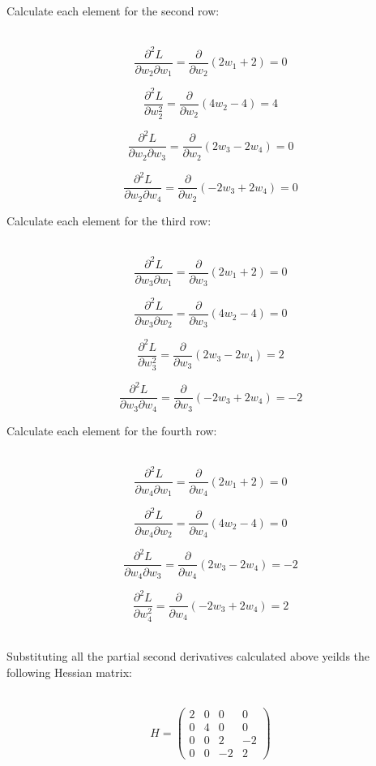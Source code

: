 \documentclass{article}
\begin{document}
\parbox{\textwidth}{
Calculate each element for the second row:
}\\

$$\frac{\partial^2 L}{\partial w_2 \partial w_1} = \frac{\partial}{\partial w_2}(2w_1 + 2) = 0$$

$$\frac{\partial^2 L}{\partial w_2^2} = \frac{\partial}{\partial w_2}(4w_2 - 4) = 4$$

$$\frac{\partial^2 L}{\partial w_2 \partial w_3} = \frac{\partial}{\partial w_2}(2w_3 - 2w_4) = 0$$

$$\frac{\partial^2 L}{\partial w_2 \partial w_4} = \frac{\partial}{\partial w_2}(-2w_3 + 2w_4) = 0$$

\parbox{\textwidth}{
Calculate each element for the third row:
}\\

$$\frac{\partial^2 L}{\partial w_3 \partial w_1} = \frac{\partial}{\partial w_3}(2w_1 + 2) = 0$$

$$\frac{\partial^2 L}{\partial w_3 \partial w_2} = \frac{\partial}{\partial w_3}(4w_2 - 4) = 0$$

$$\frac{\partial^2 L}{\partial w_3^2} = \frac{\partial}{\partial w_3}(2w_3 - 2w_4) = 2$$

$$\frac{\partial^2 L}{\partial w_3 \partial w_4} = \frac{\partial}{\partial w_3}(-2w_3 + 2w_4) = -2$$

\parbox{\textwidth}{
Calculate each element for the fourth row:
}\\

$$\frac{\partial^2 L}{\partial w_4 \partial w_1} = \frac{\partial}{\partial w_4}(2w_1 + 2) = 0$$

$$\frac{\partial^2 L}{\partial w_4 \partial w_2} = \frac{\partial}{\partial w_4}(4w_2 - 4) = 0$$

$$\frac{\partial^2 L}{\partial w_4 \partial w_3} = \frac{\partial}{\partial w_4}(2w_3 - 2w_4) = -2$$

$$\frac{\partial^2 L}{\partial w_4^2} = \frac{\partial}{\partial w_4}(-2w_3 + 2w_4) = 2$$\\

\parbox{\textwidth}{
Substituting all the partial second derivatives calculated above yeilds the following Hessian matrix:
}\\

$$H = \begin{pmatrix} 
2 & 0 & 0 & 0 \\
0 & 4 & 0 & 0 \\
0 & 0 & 2 & -2 \\
0 & 0 & -2 & 2
\end{pmatrix}$$\\
\end{document}
